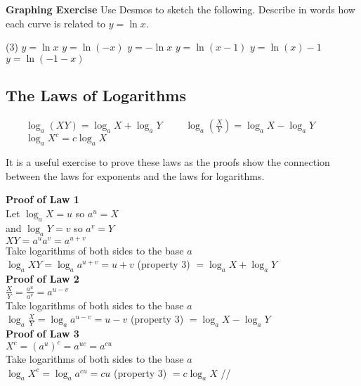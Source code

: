 \textbf{Graphing Exercise}
Use Desmos to sketch the following. Describe in words how each curve is related to $y =\ln  x$. 

\begin{tasks}(3)
	\task $y =\ln  x$ 
\task  $y =\ln  ( -x)$ 
\task  $y = -\ln  x$ 
	\task  $y =\ln  (x -1)$ 
	\task  $y =\ln  (x) -1$ 
	\task $y =\ln  ( -1 -x)$ \end{tasks}


\subsection*{The Laws of Logarithms}
\begin{tcolorbox}
\begin{tasks}[label-width={10em}]
	\task[Law 1:] $\qquad\log _{a} \left (X Y\right ) =\log _{a} X +\log _{a} Y$ 	
	\task[Law 2:] $\qquad\log _{a} \left(\frac{X}{Y}\right) =\log _{a} X -\log _{a} Y$ 	
	\task[Law 3:] $\qquad\log _{a} X^{c} =c \log _{a} X$ 
\end{tasks}
\end{tcolorbox}

It is a useful exercise to prove these laws as the proofs show the
connection between the laws for exponents and the laws for logarithms. 

\textbf{Proof of Law 1} \\
Let $\log _{a} X =u$ so $a^{u} =X$ \\\relax and $\log _{a} Y =v$ so $a^{v} =Y$ \\\relax $X Y =a^{u} a^{v} =a^{u +v}$ \\\relax Take logarithms of both sides to the base $a$ \\\relax $\log _{a} X Y =\log _{a} a^{u +v} =u +v$ {\scriptsize (property 3)} $ =\log _{a} X +\log _{a} Y$ \\

\textbf{Proof of Law 2} \\
$\frac{X}{Y} =\frac{a^{u}}{a^{v}} =a^{u -v}$ \\\relax Take logarithms of both sides to the base $a$ \\\relax $\log _{a} \frac{X}{Y} =\log _{a} a^{u -v} =u -v$ {\scriptsize (property 3)} $ =\log _{a} X -\log _{a} Y$ \\

\textbf{Proof of Law 3} \\
 $X^{c} =\left (a^{u}\right )^{c} =a^{u c} =a^{c u}$ \\\relax Take logarithms of both sides to the base $a$ \\\relax $\log _{a} X^{c} =\log _{a} a^{c u} =c u$ {\scriptsize (property 3)} $ =c \log _{a} X$ //

